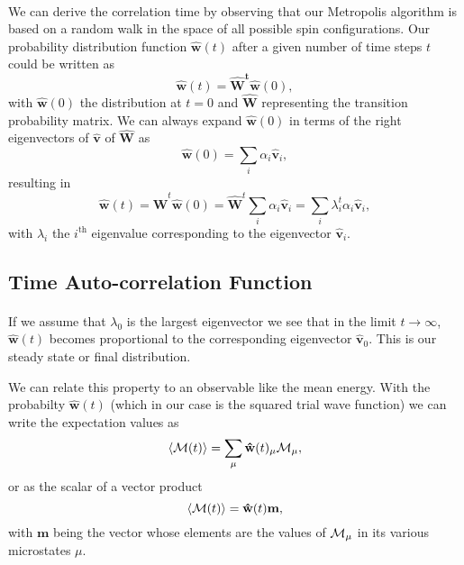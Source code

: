 \documentclass[%
twoside,                 %
final,                   %
10pt]{article}
\begin{document}
\paragraph{}
We can derive the correlation time by observing that our Metropolis algorithm is based on a random
walk in the space of all  possible spin configurations. 
Our probability 
distribution function $\mathbf{\hat{w}}(t)$ after a given number of time steps $t$ could be written as
\[
   \mathbf{\hat{w}}(t) = \mathbf{\hat{W}^t\hat{w}}(0),
\]
with $\mathbf{\hat{w}}(0)$ the distribution at $t=0$ and $\mathbf{\hat{W}}$ representing the 
transition probability matrix. 
We can always expand $\mathbf{\hat{w}}(0)$ in terms of the right eigenvectors of 
$\mathbf{\hat{v}}$ of $\mathbf{\hat{W}}$ as 
\[
    \mathbf{\hat{w}}(0)  = \sum_i\alpha_i\mathbf{\hat{v}}_i,
\]
resulting in 
\[
   \mathbf{\hat{w}}(t) = \mathbf{\hat{W}}^t\mathbf{\hat{w}}(0)=\mathbf{\hat{W}}^t\sum_i\alpha_i\mathbf{\hat{v}}_i=
\sum_i\lambda_i^t\alpha_i\mathbf{\hat{v}}_i,
\]
with $\lambda_i$ the $i^{\mathrm{th}}$ eigenvalue corresponding to  
the eigenvector $\mathbf{\hat{v}}_i$.






\subsection*{Time Auto-correlation Function}

\paragraph{}
If we assume that $\lambda_0$ is the largest eigenvector we see that in the limit $t\rightarrow \infty$,
$\mathbf{\hat{w}}(t)$ becomes proportional to the corresponding eigenvector 
$\mathbf{\hat{v}}_0$. This is our steady state or final distribution. 

We can relate this property to an observable like the mean energy.
With the probabilty $\mathbf{\hat{w}}(t)$ (which in our case is the squared trial wave function) we
can write the expectation values as 
\[
 \langle {\cal M}(t) \rangle  = \sum_{\mu} \mathbf{\hat{w}}(t)_{\mu}{\cal M}_{\mu},
\] 
or as the scalar of a  vector product
 \[
 \langle {\cal M}(t) \rangle  = \mathbf{\hat{w}}(t)\mathbf{m},
\] 
with $\mathbf{m}$ being the vector whose elements are the values of ${\cal M}_{\mu}$ in its 
various microstates $\mu$.
\end{document}
